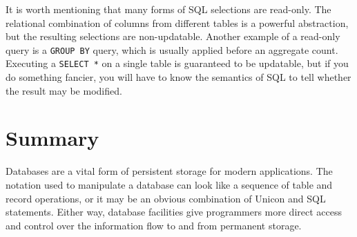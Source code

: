 It is worth mentioning that many forms of SQL selections are read-only.
The relational combination of columns from different tables is a
powerful abstraction, but the resulting selections are non-updatable.
Another example of a read-only query is a \texttt{GROUP BY} query,
which is usually applied before an aggregate count. Executing a
\texttt{SELECT *} on a single table is guaranteed to be updatable, but
if you do something fancier, you will have to know the semantics of SQL
to tell whether the result may be modified.

\section{Summary}

Databases are a vital form of persistent storage for modern
applications. The notation used to manipulate a database can look like
a sequence of table and record operations, or it may be an obvious
combination of Unicon and SQL statements. Either way, database
facilities give programmers more direct access and control over the
information flow to and from permanent storage.


\bigskip

